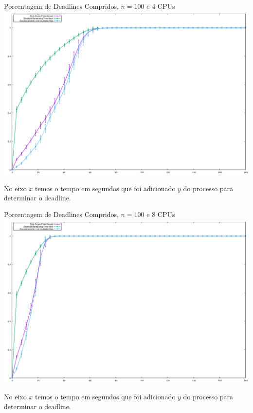 \documentclass{beamer}
\begin{document}
\begin{frame}{Porcentagem de Deadlines Compridos, $n = 100$ e $4$ CPUs}
	\includegraphics[width=\textwidth]{graphs/testes_capella/result/deadlines-r4-100}
	
	{\tiny No eixo $x$ temos o tempo em segundos que foi adicionado $y$ do processo para determinar o deadline.}
\end{frame}


\begin{frame}{Porcentagem de Deadlines Compridos, $n = 100$ e $8$ CPUs}
	\includegraphics[width=\textwidth]{graphs/testes_capella/result/deadlines-r8-100}
	
	{\tiny No eixo $x$ temos o tempo em segundos que foi adicionado $y$ do processo para determinar o deadline.}
\end{frame}
\end{document}
